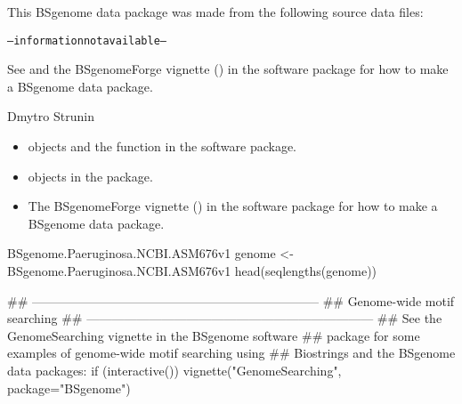 \documentclass[a4paper]{book}
\begin{document}
%
\begin{Note}\relax
This BSgenome data package was made from the following source data files:
\begin{alltt}
-- information not available --
  \end{alltt}


See  and the BSgenomeForge
vignette () in the 
software package for how to make a BSgenome data package.
\end{Note}
%
\begin{Author}\relax
Dmytro Strunin
\end{Author}
%
\begin{SeeAlso}\relax
\begin{itemize}

\item{}  objects and the
 function
in the  software package.
\item{}  objects in the 
package.
\item{} The BSgenomeForge vignette ()
in the  software package for how to make a BSgenome
data package.

\end{itemize}

\end{SeeAlso}
%
\begin{Examples}
\begin{ExampleCode}
BSgenome.Paeruginosa.NCBI.ASM676v1
genome <- BSgenome.Paeruginosa.NCBI.ASM676v1
head(seqlengths(genome))


## ---------------------------------------------------------------------
## Genome-wide motif searching
## ---------------------------------------------------------------------
## See the GenomeSearching vignette in the BSgenome software
## package for some examples of genome-wide motif searching using
## Biostrings and the BSgenome data packages:
if (interactive())
    vignette("GenomeSearching", package="BSgenome")
\end{ExampleCode}
\end{Examples}
\printindex{}
\end{document}
